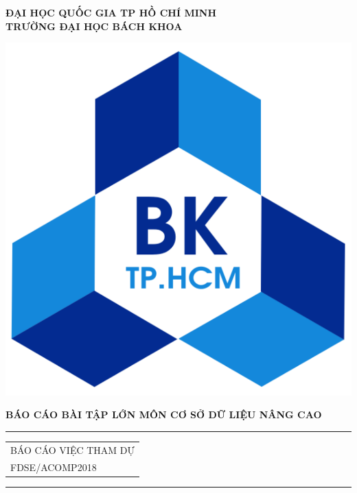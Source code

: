 \documentclass{hcmutarticle}
\begin{document}
\thispagestyle{empty}
\begin{center}
\LARGE\bfseries ĐẠI HỌC QUỐC GIA TP HỒ CHÍ MINH \\
TRƯỜNG ĐẠI HỌC BÁCH KHOA
\end{center}

\begin{center}
\includegraphics[scale=0.2]{hcmut.pdf}\\[1cm]
\end{center}

\vspace{1cm}

\begin{center}
\Large \bfseries BÁO CÁO BÀI TẬP LỚN MÔN CƠ SỞ DỮ LIỆU NÂNG CAO\\[0.5cm]
\end{center}
\rule{\textwidth}{1pt}
\vspace{2pt}
\begin{center}
\Huge
\begin{tabular}{@{}l}
BÁO CÁO VIỆC THAM DỰ \\
FDSE/ACOMP2018\\[6pt]
\end{tabular}
\end{center}
\rule{\textwidth}{1pt}\\[1cm]
\end{document}
